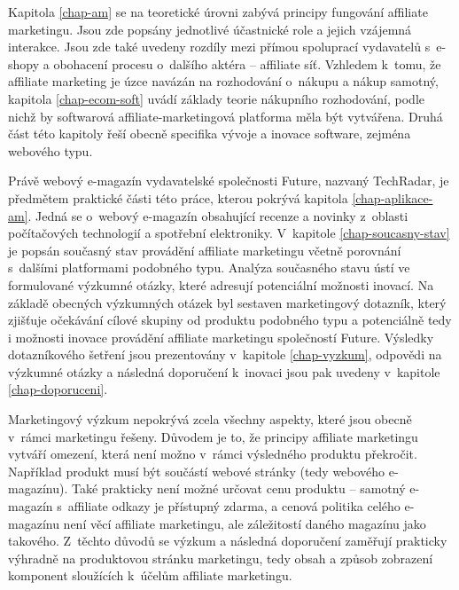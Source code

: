 \documentclass[12pt,oneside,openany]{fithesis}
\begin{document}
Kapitola \hyperlink{chap-am}{{\ref{chap-am}}} se na teoretické úrovni 
zabývá principy fungování affiliate marketingu. Jsou zde popsány 
jednotlivé účastnické role a jejich vzájemná interakce. Jsou zde také 
uvedeny rozdíly mezi přímou spoluprací vydavatelů s~e-shopy a obohacení 
procesu o~dalšího aktéra -- affiliate síť. Vzhledem k~tomu, že affiliate 
marketing je úzce navázán na rozhodování o~nákupu a nákup samotný, 
kapitola \hyperlink{chap-ecom-soft}{{\ref{chap-ecom-soft}}} uvádí základy 
teorie nákupního rozhodování, podle nichž by softwarová 
affiliate-marketingová platforma měla být vytvářena. Druhá část této 
kapitoly řeší obecně specifika vývoje a inovace software, zejména 
webového typu.

Právě webový e-magazín vydavatelské společnosti Future, nazvaný 
TechRadar, je předmětem praktické části této práce, kterou pokrývá 
kapitola \hyperlink{chap-aplikace-am}{{\ref{chap-aplikace-am}}}. Jedná se 
o~webový e-magazín obsahující recenze a novinky z~oblasti počítačových 
technologií a spotřební elektroniky. V~kapitole 
\hyperlink{chap-soucasny-stav}{{\ref{chap-soucasny-stav}}} je popsán 
současný stav provádění affiliate marketingu včetně porovnání 
s~dalšími platformami podobného typu. 
Analýza současného stavu ústí ve formulované výzkumné otázky, které adresují
potenciální možnosti inovací. Na základě obecných výzkumných otázek byl sestaven
marketingový dotazník, který zjišťuje očekávání cílové skupiny od produktu podobného typu
a potenciálně tedy i možnosti inovace provádění affiliate
marketingu společností Future. Výsledky dotazníkového šetření jsou prezentovány 
v~kapitole \hyperlink{chap-vyzkum}{{\ref{chap-vyzkum}}}, odpovědi na výzkumné otázky a
následná doporučení k~inovaci jsou pak uvedeny v~kapitole
\hyperlink{chap-doporuceni}{{\ref{chap-doporuceni}}}.

Marketingový výzkum nepokrývá zcela všechny aspekty, které jsou obecně 
v~rámci marketingu řešeny. Důvodem je to, že principy affiliate marketingu 
vytváří omezení, která není možno v~rámci výsledného produktu 
překročit. Například produkt musí být součástí webové stránky (tedy 
webového e-magazínu). Také prakticky není možné určovat cenu produktu -- 
samotný e-magazín s~affiliate odkazy je přístupný zdarma, a cenová 
politika celého e-magazínu není věcí affiliate marketingu, ale 
záležitostí daného magazínu jako takového. Z~těchto důvodů se výzkum 
a následná doporučení zaměřují prakticky výhradně na produktovou 
stránku marketingu, tedy obsah a způsob zobrazení komponent sloužících 
k~účelům affiliate marketingu.
\end{document}
